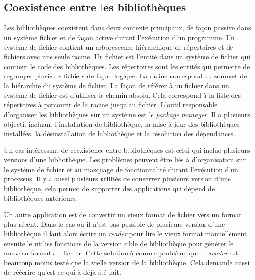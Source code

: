 \subsection{Coexistence entre les bibliothèques}

Les bibliothèques coexistent dans deux contexte principaux, de façon passive
dans un système fichier et de façon active durant l'exécution d'un programme.
Un système de fichier contient un arborescence hiérarchique de répertoires et
de fichiers avec une seule racine. Un fichier est l'entité dans un système de
fichier qui contient le code des bibliothèques.  Les répertoires sont les
entités qui permette de regrouper plusieurs fichiers de façon logique. La
racine correspond au sommet de la hiérarchie du système de fichier. La façon de
référer à un fichier dans un système de fichier est d'utiliser le
chemin absolu. Cela correspond à la liste des répertoires à parcourir de la
racine jusqu'au fichier. L'outil responsable d'organiser les bibliothèques sur
un système est le \textit{package manager}. Il a plusieurs objectif
incluant l'installation de bibliothèque, la mise à jour des
bibliothèques installées, la désinstallation de bibliothèque et la résolution
des dépendances.

Un cas intéressant de coexistence entre bibliothèques est celui qui inclue
plusieurs versions d'une bibliothèque. Les problèmes peuvent être liés à
d'organisation sur le système de fichier et au masquage de fonctionnalité
durant l'exécution d'un processus.  Il y a aussi plusieurs utilités de
conserver plusieurs version d'une bibliothèque, cela permet de supporter des
applications qui dépend de bibliothèques antérieurs.

Un autre application est de convertir un vieux format de fichier vers un format
plus récent. Dans le cas où il n'est pas possible de plusieurs version d'une bibliothèque
il faut alors écrire un \textit{reader} pour lire le vieux format manuellement ensuite le
utilise fonctions de la version cible de bibliothèque pour générer le nouveau format du fichier.
Cette solution à comme problème que le \textit{reader} est beaucoup moins testé que la
vielle version de la bibliothèque. Cela demande aussi de réécrire qu'est-ce qui à déjà été fait.

